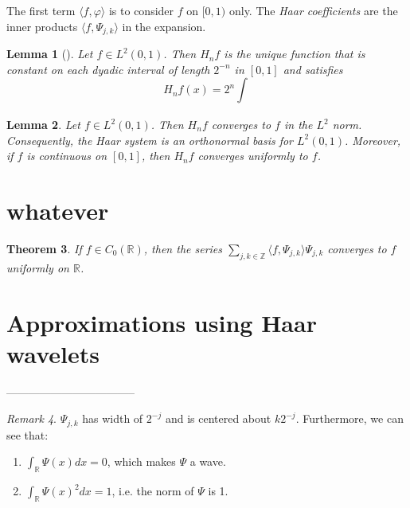 \documentclass[2pt]{amsart}
\theoremstyle{theorem} %
\newtheorem{thm}{Theorem}[section] %
\newtheorem{lem}[thm]{Lemma} %
\theoremstyle{definition}
\theoremstyle{example}
\theoremstyle{remark}
\newtheorem{rem}[thm]{Remark}
\numberwithin{equation}{section}
\newcommand{\R}{\mathbb{R}}
\newcommand{\Z}{\mathbb{Z}}
\begin{document}
	The first term $ \langle f, \varphi \rangle $ is to consider $ f $ on $ [0,1) $ only.
	The \emph{Haar coefficients} are the inner products $ \langle f, \varPsi_{j,k} \rangle $ in the expansion.                                         
	
	
	\begin{lem}[{\cite[410]{davidson}}]
		Let $ f \in L^2 (0,1) $. Then $ H_n f $ is the unique function that is constant on each dyadic interval of length $ 2^{-n} $ in $ [0,1] $ and satisfies
		\[ H_nf(x) = 2^n \int_{} \]
	\end{lem}
	
	\begin{lem}
		Let $ f \in L^2(0,1) $. Then $ H_nf $ converges to $ f $ in the $ L^2 $ norm. Consequently, the Haar system is an orthonormal basis for $ L^2(0,1) $. Moreover, if $ f $ is continuous on $ [0,1] $, then $ H_nf $ converges uniformly to $ f $.
	\end{lem}
	
	\section{whatever}
	\begin{thm} \label{convergence}
		If $ f \in C_0(\R) $, then the series $ \sum_{j,k \in \Z} \langle f, \varPsi_{j,k} \rangle \varPsi_{j,k} $ converges to $ f $ uniformly on $ \R $.
	\end{thm}
	
	\section{Approximations using Haar wavelets}
	
	
-----------------------------------

\begin{rem}
	$ \varPsi_{j,k} $ has width of $ 2^{-j} $ and is centered about $ k 2^{-j} $. Furthermore, we can see that:
	\begin{enumerate}
		\item $ \int_{\R} \varPsi(x)dx = 0 $, which makes $ \varPsi $ a wave.
		\item  $ \int_{\R} \varPsi(x)^2dx = 1 $, i.e. the norm of $ \varPsi $ is 1.
	\end{enumerate}
\end{rem}	
\end{document}
